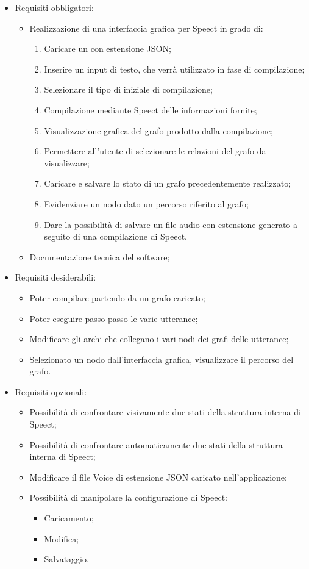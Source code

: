 \documentclass[../AnalisideiRequisiti.tex]{subfiles}
\begin{document}
\begin{itemize}
	\item{} Requisiti obbligatori:
	\begin{itemize}
		\item{}Realizzazione di una interfaccia grafica per Speect in grado di:
		\begin{enumerate}
			\item{} Caricare un  con estensione JSON;
			\item{} Inserire un input di testo, che verrà utilizzato in fase di compilazione;
			\item{} Selezionare il tipo di  iniziale di compilazione;
			\item{} Compilazione mediante Speect delle informazioni fornite;
			\item{} Visualizzazione grafica del grafo prodotto dalla compilazione;
			\item{} Permettere all'utente di selezionare le relazioni del grafo da visualizzare;
			\item{} Caricare e salvare lo stato di un grafo precedentemente realizzato;
			\item{} Evidenziare un nodo dato un percorso riferito al grafo;
			\item{} Dare la possibilità di salvare un file audio con estensione  generato a seguito di una compilazione di Speect.
		\end{enumerate}
		\item{}	Documentazione tecnica del software;
	\end{itemize}
	\item{} Requisiti desiderabili:
	\begin{itemize}
		\item{} Poter compilare partendo da un grafo caricato;
		\item{} Poter eseguire passo passo le varie utterance;
		\item{}	Modificare gli archi che collegano i vari nodi dei grafi delle utterance;
		\item{} Selezionato un nodo dall'interfaccia grafica, visualizzare il percorso del grafo.
	\end{itemize}
	\item{} Requisiti opzionali:
	\begin{itemize}
		\item{}	Possibilità di confrontare visivamente due stati della struttura interna di Speect;
		\item{} Possibilità di confrontare automaticamente due stati della struttura interna di Speect;
		\item{}Modificare il file Voice di estensione JSON caricato nell'applicazione;
		\item{}	Possibilità di manipolare la configurazione di Speect:
		\begin{itemize}
			\item{} Caricamento;
			\item{}	Modifica;
			\item{} Salvataggio.
		\end{itemize}
	\end{itemize}
	
\end{itemize}
\end{document}
